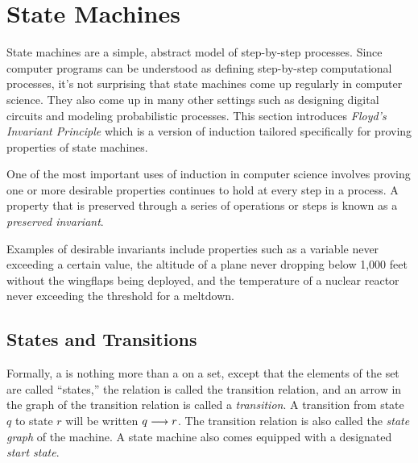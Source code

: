 
\chapter{State Machines}\label{state_machine_chap}
State machines are a simple, abstract model of step-by-step processes.
Since computer programs can be understood as defining step-by-step
computational processes, it's not surprising that state machines come
up regularly in computer science.  They also come up in many other
settings such as designing digital circuits and modeling probabilistic
processes.  This section introduces \emph{Floyd's Invariant Principle}
which is a version of induction tailored specifically for proving
properties of state machines.

\iffalse
You may already have seen them in a digital logic course,
a compiler course, or a probability course.
\fi

One of the most important uses of induction in computer science
involves proving one or more desirable properties continues to hold at
every step in a process.  A property that is preserved through a
series of operations or steps is known as a \emph{preserved
  invariant}.

Examples of desirable invariants include properties such as a variable
never exceeding a certain value, the altitude of a plane never
dropping below 1,000 feet without the wingflaps \iffalse and landing
gear\fi being deployed, and the temperature of a nuclear reactor never
exceeding the threshold for a meltdown.

\iffalse  %
In particular, we show that the proposition is true at the beginning
(this is the base case) and that if it is true after $t$ steps have
been taken, it will also be true after step~$t + 1$ (this is the
inductive step).  We can then use the induction principle to conclude
that the proposition is indeed an invariant, namely, that it will
always hold.
\fi

\section{States and Transitions}

Formally, a  is nothing more than a  on a set, except that the elements of the set are called
``states,'' the relation is called the transition relation, and an
arrow in the graph of the transition relation is called a
\emph{transition}.  A transition from state $q$ to state $r$ will be
written $q \mathrel{\longrightarrow} r$.  The transition relation is also called the
\emph{state graph} of the machine.  A state machine also comes
equipped with a designated \emph{start state}.

